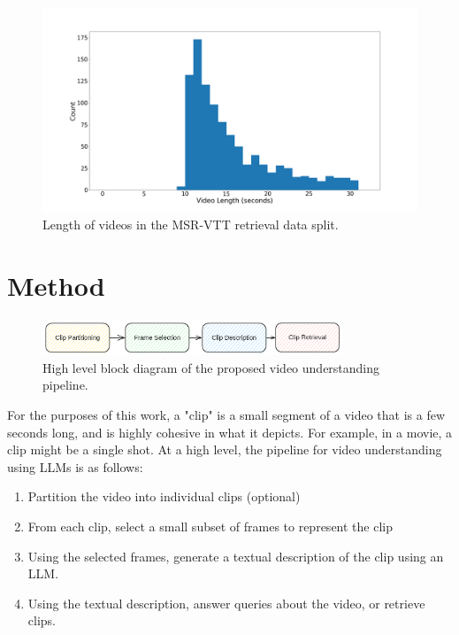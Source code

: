 \documentclass{article}
\begin{document}
\begin{figure}
      \centering
      \includegraphics[width=\textwidth]{figures/msr-vtt-length-histogram.png}
      \caption{Length of videos in the MSR-VTT retrieval data split.}
      \label{fig:length_histogram}
\end{figure}

\section{Method}

\begin{figure}
      \centering
      \includegraphics[width=0.8\textwidth]{figures/pipeline.png}
      \caption{High level block diagram of the proposed video understanding pipeline.}
      \label{fig:pipeline}
\end{figure}

For the purposes of this work, a "clip" is a small segment of a video that is a few seconds long, 
and is highly cohesive in what it depicts. For example, in a movie, a clip might be a single shot.
At a high level, the pipeline for video understanding using LLMs is as follows:
\begin{enumerate}
      \item Partition the video into individual clips (optional)
      \item From each clip, select a small subset of frames to represent the clip
      \item Using the selected frames, generate a textual description of the clip using an LLM.
      \item Using the textual description, answer queries about the video, or retrieve clips.
\end{enumerate}
\end{document}
